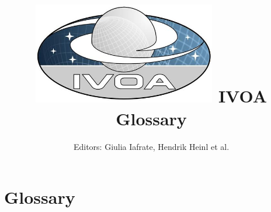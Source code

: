 \documentclass{article}[11pt,a4paper]
\title{\includegraphics[width=8cm]{IVOA.jpg}\newline
\color{ivoa}IVOA Glossary}
\author{Editors: Giulia Iafrate, Hendrik Heinl et al.}
\begin{document}
\maketitle
\pagebreak

\section*{Glossary}


\end{document}
